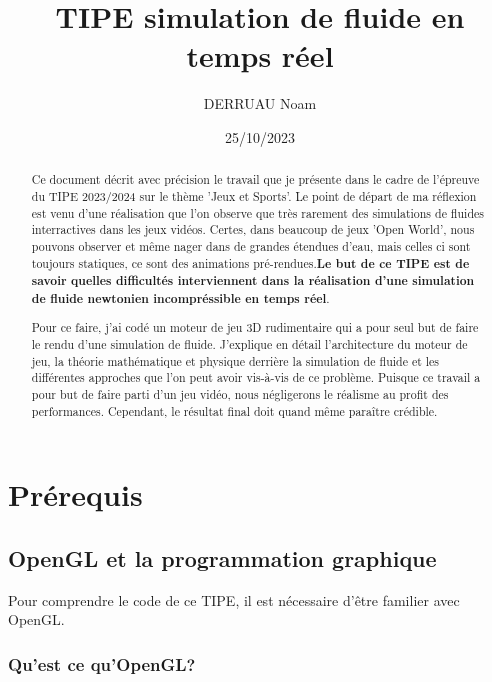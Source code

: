 \documentclass[a4paper,10pt]{report}
\title{TIPE simulation de fluide en temps réel}
\author{DERRUAU Noam}
\date{25/10/2023}
\begin{document}
\maketitle

\vfill

\begin{abstract}
    Ce document décrit avec précision le travail que je présente dans le cadre de l'épreuve du TIPE 2023/2024 sur le thème 'Jeux et Sports'. Le point de départ de ma réflexion est venu d'une réalisation que l'on observe que très rarement des simulations de fluides interractives dans les jeux vidéos. Certes, dans beaucoup de jeux 'Open World', nous pouvons observer et même nager dans de grandes étendues d'eau, mais celles ci sont toujours statiques, ce sont des animations pré-rendues.\textbf{Le but de ce TIPE est de savoir quelles difficultés interviennent dans la réalisation d'une simulation de fluide newtonien incompréssible en temps réel}.

    Pour ce faire, j'ai codé un moteur de jeu 3D rudimentaire qui a pour seul but de faire le rendu d'une simulation de fluide. J'explique en détail l'architecture du moteur de jeu, la théorie mathématique et physique derrière la simulation de fluide et les différentes approches que l'on peut avoir vis-à-vis de ce problème. Puisque ce travail a pour but de faire parti d'un jeu vidéo, nous négligerons le réalisme au profit des performances. Cependant, le résultat final doit quand même paraître crédible.
\end{abstract}


\newpage
\tableofcontents
\newpage

\chapter{Prérequis}

\section{OpenGL et la programmation graphique}
Pour comprendre le code de ce TIPE, il est nécessaire d'être familier avec OpenGL.
\subsection{Qu'est ce qu'OpenGL?}
\end{document}
